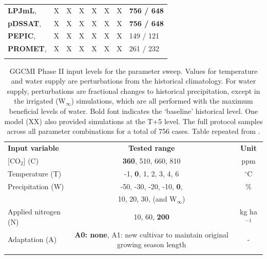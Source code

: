 \documentclass[gmd, manuscript]{copernicus} %
\begin{document}
\begin{table}[ht]
\begin{tabular}{p{6cm} p{1cm} p{1cm} p{1cm} p{1cm} p{1cm} p{1cm} p{1.9cm}}
        \textbf{LPJmL},     \citet{von_Bloh_implementing_2018} & X & X & X & X & X & X & \textbf{756 / 648}\\ \middlehline
        \textbf{pDSSAT},    \citet{Elliott2014b, JONES2003235} & X & X & X & X & X & X & \textbf{756 / 648}\\ \middlehline
        \textbf{PEPIC},     \citet{LIU2016164, LIU2016}        & X & X & X & X & X & X & 149 / 121\\ \middlehline
        \textbf{PROMET},    \citet{Hank2015, MAUSER2015, Zabel2019}       & X & X & X & X & X & X & 261 / 232\\
        \bottomhline
    \end{tabular}
\end{table}

\begin{table}[ht]
    \caption{
    GGCMI Phase II input levels for the parameter sweep. 
    Values for temperature and water supply are perturbations from the historical climatology. 
    For water supply, perturbations are fractional changes to historical precipitation, except in the irrigated (W$_{\infty}$) simulations, which are all performed with the maximum beneficial levels of water. 
    Bold font indicates the `baseline' historical level. 
	One model (XX) also provided simulations at the T+5 level. 
    The full protocol samples across all parameter combinations for a total of 756 cases.
    Table repeated from \citet{franke2019ctwnexperiment}.
    }
    \label{table:inputs} 
    \begin{tabular}{lcc} 
        \tophline \vspace{1mm}
        \textbf{Input variable} & \textbf{Tested range} & \textbf{Unit} \\ \middlehline \vspace{1mm}
        [CO$_2$] (C) & \textbf{360}, 510, 660, 810 & ppm\\ \middlehline \vspace{1mm}
        Temperature (T) & -1, \textbf{0}, 1, 2, 3, 4, 6 & $^{\circ}$C\\ \middlehline \vspace{1mm}
        Precipitation (W) & -50, -30, -20, -10, \textbf{0}, & \% \\
        {} & 10, 20, 30, (and W$_{\infty}$) & {} \\ \middlehline \vspace{1mm}
        Applied nitrogen (N) & 10, 60, \textbf{200} & kg ha$^{-1}$ \\ \middlehline \vspace{1mm}
        Adaptation (A) & \textbf{A0: none}, A1: new cultivar to maintain original growing season length & -\\ \bottomhline
    \end{tabular}\\
\end{table}
\end{document}
